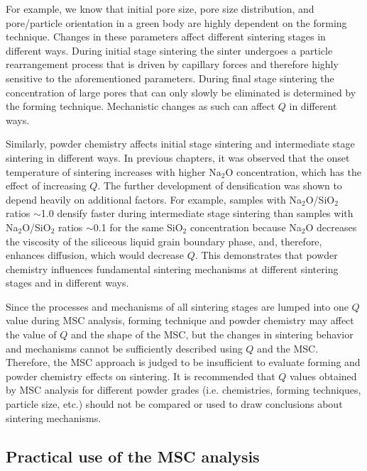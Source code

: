 For example, we know that initial pore size, pore size distribution, \newline and pore/particle orientation in a green body are highly dependent on the forming technique. Changes in these parameters affect different sintering stages in different ways. During initial stage sintering the sinter undergoes a particle rearrangement process that is driven by capillary forces and therefore highly sensitive to the aforementioned parameters. During final stage sintering the concentration of large pores that can only slowly be eliminated is determined by the forming technique. Mechanistic changes as such can affect $Q$ in different ways.

Similarly, powder chemistry affects initial stage sintering and intermediate stage sintering in different ways. In previous chapters, it was observed that the onset temperature of sintering increases with higher Na$_{2}$O concentration, which has the effect of increasing $Q$. The further development of densification was shown to depend heavily on additional factors. For example, samples with Na$_{2}$O/SiO$_{2}$ ratios $\sim$1.0 densify faster during intermediate stage sintering than samples with Na$_{2}$O/SiO$_{2}$ ratios $\sim$0.1 for the same SiO$_{2}$ concentration because Na$_{2}$O decreases the viscosity of the siliceous liquid grain boundary phase, and, therefore, enhances diffusion, which would decrease $Q$. This demonstrates that powder chemistry influences fundamental sintering mechanisms at different sintering stages and in different ways. 

Since the processes and mechanisms of all sintering stages are lumped into one $Q$ value during MSC analysis, forming technique and powder chemistry may affect the value of $Q$ and the shape of the MSC, but the changes in sintering behavior and mechanisms cannot be sufficiently described using $Q$ and the MSC. Therefore, the MSC approach is judged to be insufficient to evaluate forming and powder chemistry effects on sintering. It is recommended that $Q$ values obtained by MSC analysis for different powder grades (i.e. chemistries, forming techniques, particle size, etc.) should not be compared or used to draw conclusions about sintering mechanisms.

\subsection{Practical use of the MSC analysis}

